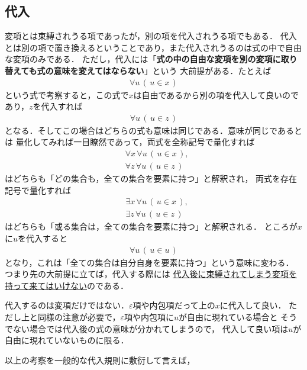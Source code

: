 \subsection{代入}
	変項とは束縛されうる項であったが，別の項を代入されうる項でもある．
	代入とは別の項で置き換えるということであり，また代入されうるのは式の中で自由な変項のみである．
	ただし，代入には「{\bf 式の中の自由な変項を別の変項に取り替えても式の意味を変えてはならない}」という
	大前提がある．たとえば
	\begin{align}
		\forall u\, (\, u \in x\, )
	\end{align}
	という式で考察すると，この式で$x$は自由であるから別の項を代入して良いのであり，$z$を代入すれば
	\begin{align}
		\forall u\, (\, u \in z\, )
	\end{align}
	となる．そしてこの場合はどちらの式も意味は同じである．意味が同じであるとは
	量化してみれば一目瞭然であって，両式を全称記号で量化すれば
	\begin{align}
		&\forall x\, \forall u\, (\, u \in x\, ), \\
		&\forall z\, \forall u\, (\, u \in z\, )
	\end{align}
	はどちらも「どの集合も，全ての集合を要素に持つ」と解釈され，
	両式を存在記号で量化すれば
	\begin{align}
		&\exists x\, \forall u\, (\, u \in x\, ), \\
		&\exists z\, \forall u\, (\, u \in z\, )
	\end{align}
	はどちらも「或る集合は，全ての集合を要素に持つ」と解釈される．
	ところが$x$に$u$を代入すると
	\begin{align}
		\forall u\, (\, u \in u\, )
	\end{align}
	となり，これは「全ての集合は自分自身を要素に持つ」という意味に変わる．
	つまり先の大前提に立てば，代入する際には
	\underline{代入後に束縛されてしまう変項を持って来てはいけない}のである．
	
	代入するのは変項だけではない．$\varepsilon$項や内包項だって上の$x$に代入して良い．
	ただし上と同様の注意が必要で，$\varepsilon$項や内包項に$u$が自由に現れている場合と
	そうでない場合では代入後の式の意味が分かれてしまうので，
	代入して良い項は$u$が自由に現れていないものに限る．
	
	以上の考察を一般的な代入規則に敷衍して言えば，
	
